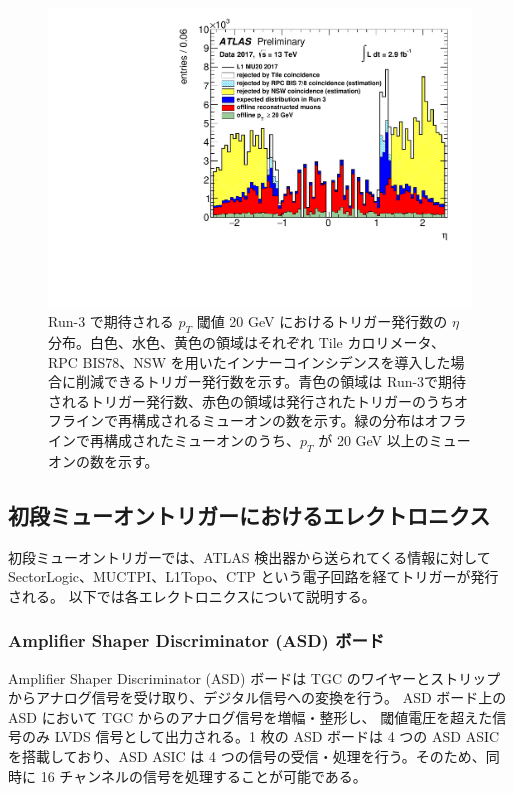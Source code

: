 \begin{figure}[tb]
  \centering
    \includegraphics[clip, width=14cm]{fig/3/ATL-COM-DAQ-2018-033-fig2.pdf}
  \caption{Run-3 で期待される $p_T$ 閾値 20 GeV におけるトリガー発行数の $\eta$ 分布。白色、水色、黄色の領域はそれぞれ Tile カロリメータ、RPC BIS78、NSW を用いたインナーコインシデンスを導入した場合に削減できるトリガー発行数を示す。青色の領域は Run-3で期待されるトリガー発行数、赤色の領域は発行されたトリガーのうちオフラインで再構成されるミューオンの数を示す。緑の分布はオフラインで再構成されたミューオンのうち、$p_T$ が 20 GeV 以上のミューオンの数を示す。}
  \label{fig:Rate_innercoincidence}
\end{figure}

\subsection{初段ミューオントリガーにおけるエレクトロニクス}
初段ミューオントリガーでは、ATLAS 検出器から送られてくる情報に対して SectorLogic、MUCTPI、L1Topo、CTP という電子回路を経てトリガーが発行される。
以下では各エレクトロニクスについて説明する。

\subsubsection{Amplifier Shaper Discriminator (ASD) ボード}
Amplifier Shaper Discriminator (ASD) ボードは TGC のワイヤーとストリップからアナログ信号を受け取り、デジタル信号への変換を行う。
ASD ボード上の ASD において TGC からのアナログ信号を増幅・整形し、 閾値電圧を超えた信号のみ LVDS 信号として出力される。1 枚の ASD ボードは 4 つの ASD ASIC を搭載しており、ASD ASIC は 4 つの信号の受信・処理を行う。そのため、同時に 16 チャンネルの信号を処理することが可能である。

